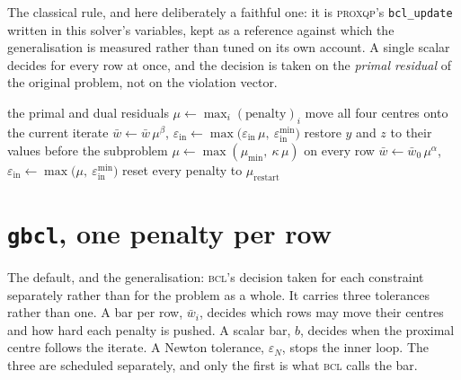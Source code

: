 \documentclass[a4paper,11pt]{book}
\theoremstyle{plain}
\theoremstyle{definition}
\theoremstyle{remark}
\numberwithin{equation}{chapter}
\numberwithin{algorithm}{chapter}
\begin{document}
	The classical rule, and here deliberately a faithful one: it is
	\textsc{proxqp}'s \texttt{bcl\_update} written in this solver's variables,
	kept as a reference against which the generalisation is measured rather than
	tuned on its own account. A single scalar decides for every row at once, and
	the decision is taken on the \emph{primal residual} of the original problem,
	not on the violation vector.

	\begin{algorithm}[H]
		\caption{\texttt{bcl}, one outer update}
		\begin{algorithmic}[1]
			\Require the primal and dual residuals
			\State $\mu\gets\max_i(\text{penalty})_i$
			\State move all four centres onto the current iterate
			\State $\bar w\gets\bar w\,\mu^{\beta}$,\quad
			$\varepsilon_{\mathrm{in}}\gets
			\max\bigl(\varepsilon_{\mathrm{in}}\,\mu,\
			\varepsilon^{\min}_{\mathrm{in}}\bigr)$
			\Else
			\State restore $y$ and $z$ to their values before the subproblem
			\State $\mu\gets\max(\mu_{\min},\ \kappa\,\mu)$ on every row
			\State $\bar w\gets\bar w_0\,\mu^{\alpha}$,\quad
			$\varepsilon_{\mathrm{in}}\gets
			\max\bigl(\mu,\ \varepsilon^{\min}_{\mathrm{in}}\bigr)$
			\EndIf
			\State reset every penalty to $\mu_{\mathrm{restart}}$
			\EndIf
		\end{algorithmic}
	\end{algorithm}

	\section{\texttt{gbcl}, one penalty per row}

	The default, and the generalisation: \textsc{bcl}'s decision taken for each
	constraint separately rather than for the problem as a whole. It carries three
	tolerances rather than one. A bar per row, $\bar w_i$, decides which rows may
	move their centres and how hard each penalty is pushed. A scalar bar, $b$,
	decides when the proximal centre follows the iterate. A Newton tolerance,
	$\varepsilon_N$, stops the inner loop. The three are scheduled separately, and
	only the first is what \textsc{bcl} calls the bar.
\end{document}
